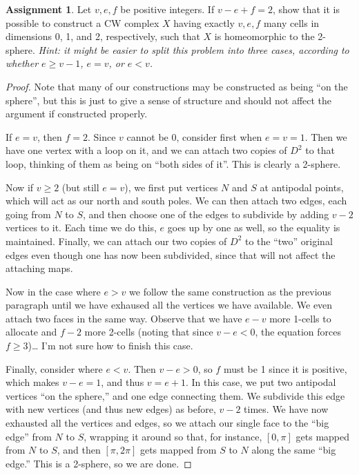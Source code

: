 \documentclass[12pt]{article}
\theoremstyle{definition}
\newtheorem{ex}{Assignment}
\begin{document}
\begin{ex}
	Let $v, e, f$ be positive integers.
	If $v - e + f = 2$, show that it is possible to construct a CW complex $X$ having exactly $v, e, f$ many cells in dimensions 0, 1, and 2, respectively, such that $X$ is homeomorphic to the 2-sphere. \textit{Hint: it might be easier to split this problem into three cases, according to whether $e \geq v - 1$, $e = v$, or $e < v$.}
\end{ex}
\begin{proof}
	Note that many of our constructions may be constructed as being ``on the sphere'', but this is just to give a sense of structure and should not affect the argument if constructed properly.

	If $e = v$, then $f = 2$.
	Since $v$ cannot be 0, consider first when $e = v = 1$.
	Then we have one vertex with a loop on it, and we can attach two copies of $D^2$ to that loop, thinking of them as being on ``both sides of it''.
	This is clearly a 2-sphere.

	Now if $v \geq 2$ (but still $e = v$), we first put vertices $N$ and $S$ at antipodal points, which will act as our north and south poles.
	We can then attach two edges, each going from $N$ to $S$, and then choose one of the edges to subdivide by adding $v-2$ vertices to it.
	Each time we do this, $e$ goes up by one as well, so the equality is maintained.
	Finally, we can attach our two copies of $D^2$ to the ``two'' original edges even though one has now been subdivided, since that will not affect the attaching maps.

	Now in the case where $e > v$ we follow the same construction as the previous paragraph until we have exhaused all the vertices we have available.
	We even attach two faces in the same way.
  Observe that we have $e - v$ more 1-cells to allocate and $f - 2$ more 2-cells (noting that since $v - e < 0$, the equation forces $f \geq 3$)\dots
  I'm not sure how to finish this case.

  Finally, consider where $e < v$.
  Then $v - e > 0$, so $f$ must be 1 since it is positive, which makes $v - e = 1$, and thus $v = e + 1$.
  In this case, we put two antipodal vertices ``on the sphere,'' and one edge connecting them.
  We subdivide this edge with new vertices (and thus new edges) as before, $v - 2$ times.
  We have now exhausted all the vertices and edges, so we attach our single face to the ``big edge'' from $N$ to $S$, wrapping it around so that, for instance, $[0, \pi]$ gets mapped from $N$ to $S$, and then $[\pi, 2\pi]$ gets mapped from $S$ to $N$ along the same ``big edge.''
  This is a 2-sphere, so we are done.
\end{proof}
\end{document}
